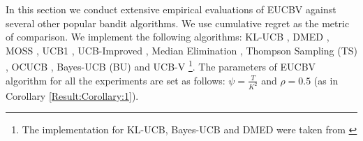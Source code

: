 In this section we conduct extensive empirical evaluations of EUCBV against several other popular bandit algorithms.  We use cumulative regret as the metric of comparison. We implement the following algorithms:  KL-UCB \citep{garivier2011kl}, DMED \citep{honda2010asymptotically}, MOSS \citep{audibert2009minimax}, UCB1 \citep{auer2002finite}, UCB-Improved \citep{auer2010ucb}, Median Elimination \citep{even2006action}, Thompson Sampling (TS) \citep{agrawal2011analysis}, OCUCB \citep{lattimore2015optimally}, Bayes-UCB (BU) \citep{kaufmann2012bayesian} and UCB-V \citep{audibert2009exploration}\footnote{The implementation for KL-UCB, Bayes-UCB and DMED were taken from \citet{CapGarKau12}}. The parameters of EUCBV algorithm for all the experiments are set as follows: $\psi=\frac{T}{K^2}$ and $\rho =0.5$ (as in Corollary \ref{Result:Corollary:1}).

